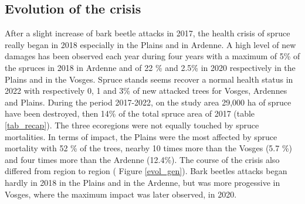 \documentclass[3p,procedia]{elsarticle}
\begin{document}
\subsection{Evolution of the crisis}

After a slight increase of bark beetle attacks in 2017, the health crisis of spruce really began in 2018 especially in the Plains and in Ardenne.
A high level of new damages has been observed each year during four years with a maximum of 5\% of the spruces in 2018 in Ardenne and of 22 \% and 2.5\% in 2020 respectively in the Plains and in the Vosges.
Spruce stands seems recover a normal health status in 2022 with respectively 0, 1 and 3\% of new attacked trees for Vosges, Ardennes and Plains.
During the period 2017-2022, on the study area 29,000 ha of spruce have been destroyed, then 14\%  of the total spruce area of 2017 (table \ref{tab_recap}).
The three ecoregions were not equally touched by spruce mortalities.
In terms of impact, the Plains were the most affected by spruce mortality with 52 \% of the trees,  nearby 10 times more than the Vosges (5.7 \%) and four times more than the Ardenne (12.4\%).
The course of the crisis also differed from region to region (  Figure \ref{evol_gen}).
Bark beetles attacks began hardly in 2018 in the Plains and in the Ardenne, but was more progessive in Vosges, where the maximum impact was later observed, in 2020.
\end{document}
